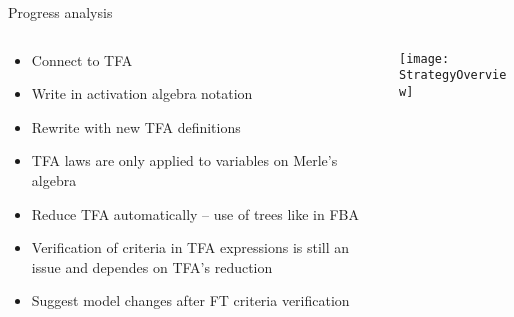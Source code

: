 \begin{frame}{Progress analysis}
\begin{columns}
    \begin{column}{0.45\paperwidth}
        \begin{itemize}
          \item<1-> Connect to TFA
          \item<2-> Write in activation algebra notation
          \item<3-> Rewrite with new TFA definitions
          \item<4-> TFA laws are only applied to variables on Merle's algebra
          \item<5-> Reduce TFA automatically -- use of trees like in FBA
          \item<6-> Verification of criteria in TFA expressions is still an issue and dependes on TFA's reduction
          \item<7-> Suggest model changes after FT criteria verification 
        \end{itemize}
    \end{column}
    \begin{column}{0.45\paperwidth}
        \texttt{[image: StrategyOverview]}
    \end{column}
\end{columns}


\end{frame}

